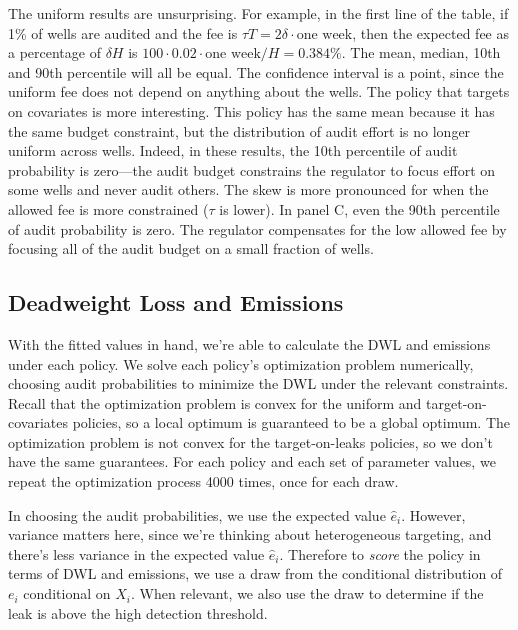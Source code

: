 \documentclass[12pt,oneside,letterpaper]{article}
\theoremstyle{definition}
\begin{document}
\begin{refsection}
The uniform results are unsurprising.
For example, in the first line of the table, if 1\% of wells are audited and the fee is \(\tau T = \text{2} \delta \cdot \text{one week}\),
then the expected fee as a percentage of \(\delta H\) is
\(\text{100} \cdot \text{0.02} \cdot \text{one week} / H = \text{0.384\%}\).
The mean, median, 10th and 90th percentile will all be equal.
The confidence interval is a point, since the uniform fee does not depend on anything about the wells.
The policy that targets on covariates is more interesting.
This policy has the same mean because it has the same budget constraint, but the distribution of audit effort is no longer uniform across wells.
Indeed, in these results, the 10th percentile of audit probability is zero---the audit budget constrains the regulator to focus effort on some wells and never audit others.
The skew is more pronounced for when the allowed fee is more constrained (\(\tau\) is lower).
In panel C, even the 90th percentile of audit probability is zero.
The regulator compensates for the low allowed fee by focusing all of the audit budget on a small fraction of wells.

\subsection{Deadweight Loss and Emissions}
\label{sec:dwl-and-emissions}


With the fitted values in hand, we're able to calculate the \gls{DWL} and emissions under each policy.
We solve each policy's optimization problem numerically, choosing audit probabilities to minimize the \gls{DWL} under the relevant constraints.
Recall that the optimization problem is convex for the uniform and target-on-covariates policies, so a local optimum is guaranteed to be a global optimum.
The optimization problem is not convex for the target-on-leaks policies, so we don't have the same guarantees.
For each policy and each set of parameter values, we repeat the optimization process 4000 times, once for each draw.

In choosing the audit probabilities, we use the expected value \(\hat{e}_i\).
However, variance matters here, since we're thinking about heterogeneous targeting, and there's less variance in the expected value \(\hat{e}_i\).
Therefore to \emph{score} the policy in terms of \gls{DWL} and emissions, we use a draw from the conditional distribution of \(e_i\) conditional on \(X_i\).
When relevant, we also use the draw to determine if the leak is above the high detection threshold.


\end{refsection}
\end{document}
